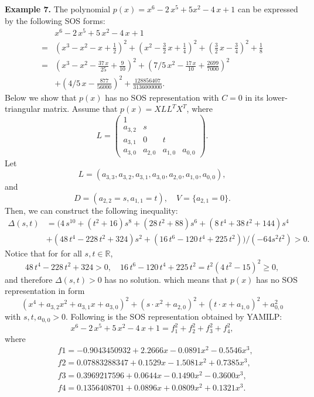 \documentclass[runningheads]{llncs}
\newcommand{\Qo}{\Delta}
\begin{document}
{{\bf Example 7. } The polynomial $p(x)={x}^{6}-2\,{x}^{5}+5{x}^{2}-4\,x+1$
can be expressed by the following SOS forms:
\begin{align}
&{x}^{6}-2\,{x}^{5}+5\,{x}^{2}-4\,x+1\nonumber\\
=& \left( {x}^{3}-{x}^{2}-x+\frac{1}{2}
 \right) ^{2}+ \left( {x}^{2}-\frac{3}{2}\,x+\frac{1}{4} \right) ^{2}+ \left( \frac{3}{2}\,x-\frac{3}{4} \right) ^{2}+\frac{1}{8}
 \label{eq-poly-yang-02}
\\
=& \left( {x}^{3}-{x}^{2}-{\frac {
37\,x}{25}}+{\frac{9}{10}} \right) ^{2}+ \left( 7/5\,{x}^{2}-{\frac {
17\,x}{10}}+{\frac{2699}{7000}} \right) ^{2}\nonumber\\
&+ \left( 4/5\,x-{\frac{877
}{56000}} \right) ^{2}+{\frac{128856407}{3136000000}}.
\end{align}
Below we show that $p(x)$ has no SOS representation with $C=0$ in its lower-triangular matrix.
Assume that $p(x)=XLL^TX^T$, where 
$$
L=\left(\begin{array}{cccc}
1&&&\\
a_{3,2}&s&&\\
a_{3,1}&0&t&\\
a_{3,0}&a_{2,0}&a_{1,0}&a_{0,0}
\end{array}\right).
$$
Let 
$$
L=\left(a_{3,3},a_{3,2},a_{3,1},a_{3,0},a_{2,0},a_{1,0},a_{0,0}\right),
$$
and
$$
D=\left(a_{2,2}=s,a_{1,1}=t\right),
\quad
V=\{a_{2,1}=0\}.
$$
Then, we can construct the following inequality:
\begin{align*}
{\Qo}(s,t) &= (4\,{s}^{10}+ \left( {t}^{2}+16 \right) {s}^{8}+ \left( 28\,{t}^{2}+
88 \right) {s}^{6}+ \left( 8\,{t}^{4}+38\,{t}^{2}+144 \right) {s}^{4} \\
& + \left( 48\,{t}^{4}-228\,{t}^{2}+324 \right) {s}^{2}+(16\,{t}^{6}-120
\,{t}^{4}+225\,{t}^{2}))/(-64s^2t^2)> 0.
\end{align*}
Notice that for for all $s,t\in \mathbb{R}$, 
$$
48\,{t}^{4}-228\,{t}^{2}+324>0, \quad 16\,{t}^{6}-120\,{t}^{4}+225\,{t}^{2}={t}^{2} \left( 4\,{t}^{2}-15
 \right) ^{2}\ge 0,
$$
and therefore ${\Qo}(s,t)> 0$ has no solution. which 
means that $p(x)$ has no SOS representation in form
$$
\left(x^4+a_{3,2}x^2+a_{3,1}x+a_{3,0}\right)^2
+\left(s\cdot x^2+a_{2,0}\right)^2
+\left(t\cdot x+a_{1,0}\right)^2
+a_{0,0}^2
$$
with $s,t,a_{0,0}>0$. 
Following is the SOS representation obtained by YAMILP: 
$$
{x}^{6}-2\,{x}^{5}+5\,{x}^{2}-4\,x+1
=f_1^2+f_2^2+f_3^2+f_4^2,
$$
where
\begin{align*}
&f1 = -0.9043450932 + 2.2666  x - 0.0891  x^2 - 0.5546  x^3,\\
&f2 = 0.07883288347 + 0.1529  x - 1.5081  x^2 + 0.7385  x^3,\\
&f3 = 0.3969217596 + 0.0644  x - 0.1490  x^2 - 0.3600  x^3,\\
&f4 = 0.1356408701 + 0.0896  x + 0.0809  x^2 + 0.1321  x^3.
\end{align*}

}
\end{document}
